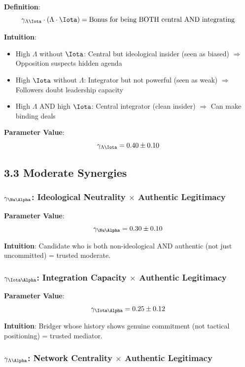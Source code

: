 \documentclass[11pt]{article}
\begin{document}
\textbf{Definition}:
$$\gamma_{\Lambda\Iota} \cdot (\Lambda \cdot \Iota) = \text{Bonus for being BOTH central AND integrating}$$

\textbf{Intuition}:

\begin{itemize}
\item High $\Lambda$ without $\Iota$: Central but ideological insider (seen as biased) $\Rightarrow$ Opposition suspects hidden agenda
\item High $\Iota$ without $\Lambda$: Integrator but not powerful (seen as weak) $\Rightarrow$ Followers doubt leadership capacity
\item High $\Lambda$ AND high $\Iota$: Central integrator (clean insider) $\Rightarrow$ Can make binding deals
\end{itemize}

\textbf{Parameter Value}:
$$\gamma_{\Lambda\Iota} = 0.40 \pm 0.10$$

\subsection{3.3 Moderate Synergies}

\subsubsection{$\gamma_{\Nu\Alpha}$: Ideological Neutrality $\times$ Authentic Legitimacy}

\textbf{Parameter Value}:
$$\gamma_{\Nu\Alpha} = 0.30 \pm 0.10$$

\textbf{Intuition}: Candidate who is both non-ideological AND authentic (not just uncommitted) = trusted moderate.

\subsubsection{$\gamma_{\Iota\Alpha}$: Integration Capacity $\times$ Authentic Legitimacy}

\textbf{Parameter Value}:
$$\gamma_{\Iota\Alpha} = 0.25 \pm 0.12$$

\textbf{Intuition}: Bridger whose history shows genuine commitment (not tactical positioning) = trusted mediator.

\subsubsection{$\gamma_{\Lambda\Alpha}$: Network Centrality $\times$ Authentic Legitimacy}
\end{document}
